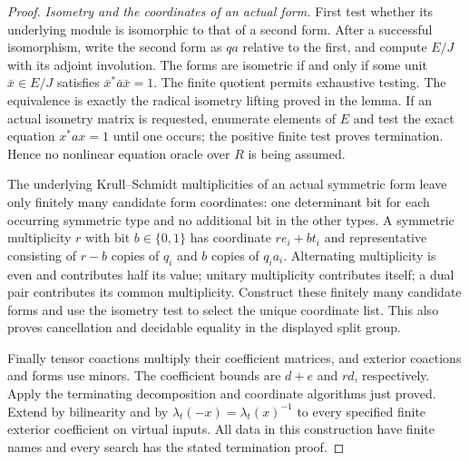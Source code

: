 \begin{proof}
\emph{Isometry and the coordinates of an actual form.}
First test whether its underlying module is isomorphic
to that of a second form.  After a successful isomorphism,
write the second form as $q a$ relative to the first,
and compute $E/J$ with its adjoint involution.
The forms are isometric if and only if some unit
$\bar x\in E/J$ satisfies
$\bar x^*\bar a\bar x=1$.
The finite quotient permits exhaustive testing.
The equivalence is exactly the radical isometry lifting
proved in the lemma.  If an actual isometry matrix is
requested, enumerate elements of $E$ and test the exact
equation $x^*ax=1$ until one occurs; the positive finite
test proves termination.  Hence no nonlinear equation
oracle over $R$ is being assumed.

The underlying Krull--Schmidt multiplicities of an
actual symmetric form leave only finitely many candidate
form coordinates: one determinant bit for each occurring
symmetric type and no additional bit in the other types.
A symmetric multiplicity $r$ with bit $b\in\{0,1\}$
has coordinate $r e_i+b t_i$ and representative consisting
of $r-b$ copies of $q_i$ and $b$ copies of $q_i a_i$.
Alternating multiplicity is even and contributes half
its value; unitary multiplicity contributes itself;
a dual pair contributes its common multiplicity.
Construct these finitely many candidate forms and use
the isometry test to select the unique coordinate list.
This also proves cancellation and decidable equality
in the displayed split group.

Finally tensor coactions multiply their coefficient
matrices, and exterior coactions and forms use minors.
The coefficient bounds are $d+e$ and $rd$, respectively.
Apply the terminating decomposition and coordinate
algorithms just proved.  Extend by bilinearity and by
$\lambda_t(-x)=\lambda_t(x)^{-1}$ to every specified
finite exterior coefficient on virtual inputs.
All data in this construction have finite names and
every search has the stated termination proof.
\end{proof}

